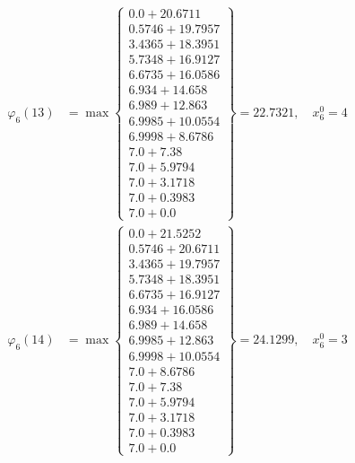 \documentclass{article}
\begin{document}
\begin{align*}
  
  
  
\varphi_{6}(13) &= \max \left\{ \begin{array}{c}
0.0 + 20.6711 \\
 0.5746 + 19.7957 \\
 3.4365 + 18.3951 \\
 5.7348 + 16.9127 \\
 6.6735 + 16.0586 \\
 6.934 + 14.658 \\
 6.989 + 12.863 \\
 6.9985 + 10.0554 \\
 6.9998 + 8.6786 \\
 7.0 + 7.38 \\
 7.0 + 5.9794 \\
 7.0 + 3.1718 \\
 7.0 + 0.3983 \\
 7.0 + 0.0
\end{array} \right\}=22.7321,\quad x_{6}^0=4\\
  
  
  
  
\varphi_{6}(14) &= \max \left\{ \begin{array}{c}
0.0 + 21.5252 \\
 0.5746 + 20.6711 \\
 3.4365 + 19.7957 \\
 5.7348 + 18.3951 \\
 6.6735 + 16.9127 \\
 6.934 + 16.0586 \\
 6.989 + 14.658 \\
 6.9985 + 12.863 \\
 6.9998 + 10.0554 \\
 7.0 + 8.6786 \\
 7.0 + 7.38 \\
 7.0 + 5.9794 \\
 7.0 + 3.1718 \\
 7.0 + 0.3983 \\
 7.0 + 0.0
\end{array} \right\}=24.1299,\quad x_{6}^0=3\\
  
  
  

\end{align*}
\end{document}
